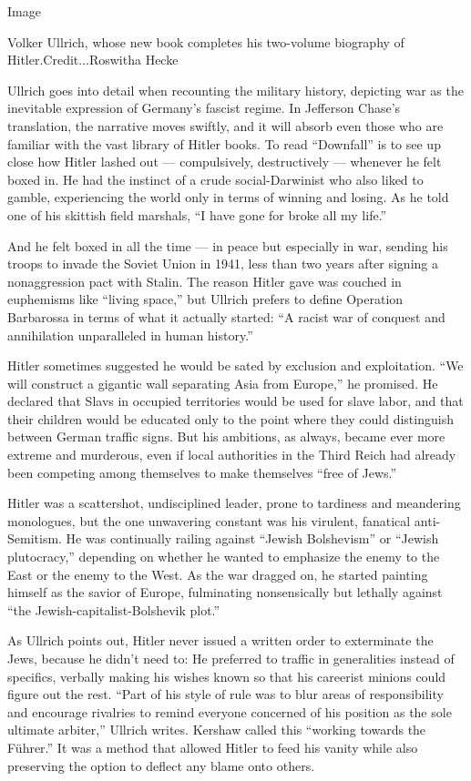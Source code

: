 Image

Volker Ullrich, whose new book completes his two-volume biography of
Hitler.Credit...Roswitha Hecke

Ullrich goes into detail when recounting the military history, depicting
war as the inevitable expression of Germany's fascist regime. In
Jefferson Chase's translation, the narrative moves swiftly, and it will
absorb even those who are familiar with the vast library of Hitler
books. To read ``Downfall'' is to see up close how Hitler lashed out ---
compulsively, destructively --- whenever he felt boxed in. He had the
instinct of a crude social-Darwinist who also liked to gamble,
experiencing the world only in terms of winning and losing. As he told
one of his skittish field marshals, ``I have gone for broke all my
life.''

And he felt boxed in all the time --- in peace but especially in war,
sending his troops to invade the Soviet Union in 1941, less than two
years after signing a nonaggression pact with Stalin. The reason Hitler
gave was couched in euphemisms like ``living space,'' but Ullrich
prefers to define Operation Barbarossa in terms of what it actually
started: ``A racist war of conquest and annihilation unparalleled in
human history.''

Hitler sometimes suggested he would be sated by exclusion and
exploitation. ``We will construct a gigantic wall separating Asia from
Europe,'' he promised. He declared that Slavs in occupied territories
would be used for slave labor, and that their children would be educated
only to the point where they could distinguish between German traffic
signs. But his ambitions, as always, became ever more extreme and
murderous, even if local authorities in the Third Reich had already been
competing among themselves to make themselves ``free of Jews.''

Hitler was a scattershot, undisciplined leader, prone to tardiness and
meandering monologues, but the one unwavering constant was his virulent,
fanatical anti-Semitism. He was continually railing against ``Jewish
Bolshevism'' or ``Jewish plutocracy,'' depending on whether he wanted to
emphasize the enemy to the East or the enemy to the West. As the war
dragged on, he started painting himself as the savior of Europe,
fulminating nonsensically but lethally against ``the
Jewish-capitalist-Bolshevik plot.''

As Ullrich points out, Hitler never issued a written order to
exterminate the Jews, because he didn't need to: He preferred to traffic
in generalities instead of specifics, verbally making his wishes known
so that his careerist minions could figure out the rest. ``Part of his
style of rule was to blur areas of responsibility and encourage
rivalries to remind everyone concerned of his position as the sole
ultimate arbiter,'' Ullrich writes. Kershaw called this ``working
towards the Führer.'' It was a method that allowed Hitler to feed his
vanity while also preserving the option to deflect any blame onto
others.

